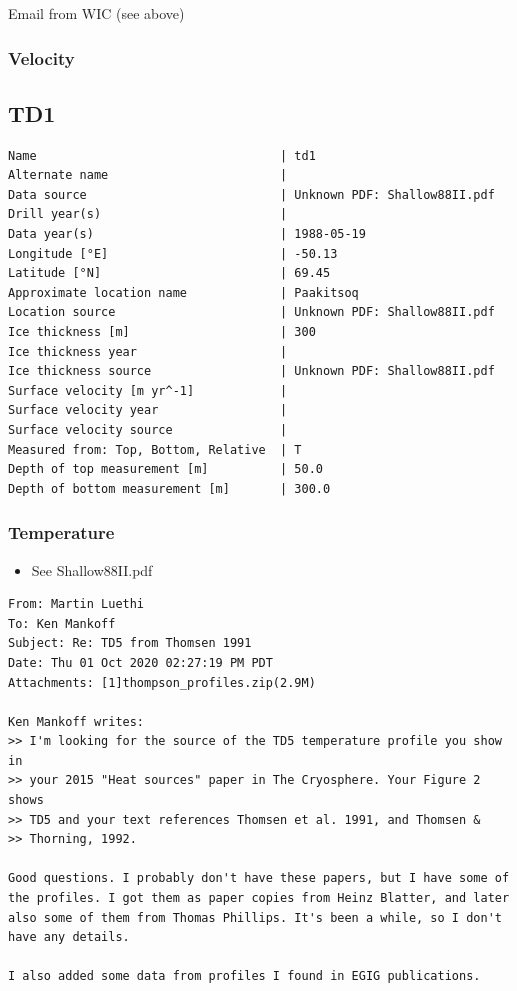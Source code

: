 \documentclass[article,a4paper,times,11pt,twoside]{article}
\begin{document}
Email from WIC (see above)

\subsubsection{Velocity}
\label{sec:org702943a}
\clearpage
\subsection{TD1}
\label{sec:orgdff9031}
\begin{verbatim}
Name                                  | td1
Alternate name                        | 
Data source                           | Unknown PDF: Shallow88II.pdf
Drill year(s)                         | 
Data year(s)                          | 1988-05-19
Longitude [°E]                        | -50.13
Latitude [°N]                         | 69.45
Approximate location name             | Paakitsoq
Location source                       | Unknown PDF: Shallow88II.pdf
Ice thickness [m]                     | 300
Ice thickness year                    | 
Ice thickness source                  | Unknown PDF: Shallow88II.pdf
Surface velocity [m yr^-1]            | 
Surface velocity year                 | 
Surface velocity source               | 
Measured from: Top, Bottom, Relative  | T
Depth of top measurement [m]          | 50.0
Depth of bottom measurement [m]       | 300.0
\end{verbatim}

\subsubsection{Temperature}
\label{sec:org3364fb7}

\begin{itemize}
\item See Shallow88II.pdf
\end{itemize}

\begin{verbatim}
From: Martin Luethi
To: Ken Mankoff
Subject: Re: TD5 from Thomsen 1991
Date: Thu 01 Oct 2020 02:27:19 PM PDT
Attachments: [1]thompson_profiles.zip(2.9M)

Ken Mankoff writes:
>> I'm looking for the source of the TD5 temperature profile you show in
>> your 2015 "Heat sources" paper in The Cryosphere. Your Figure 2 shows
>> TD5 and your text references Thomsen et al. 1991, and Thomsen &
>> Thorning, 1992.

Good questions. I probably don't have these papers, but I have some of
the profiles. I got them as paper copies from Heinz Blatter, and later
also some of them from Thomas Phillips. It's been a while, so I don't
have any details.

I also added some data from profiles I found in EGIG publications. 
\end{verbatim}
\end{document}
